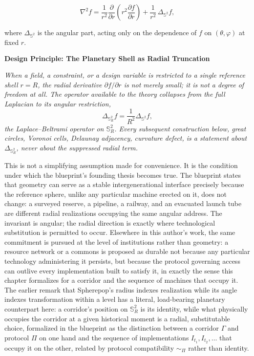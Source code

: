 \documentclass[11pt,fleqn]{book}
\numberwithin{equation}{chapter}
\newenvironment{principle}[1]
  {\begin{principleEnv}
   \noindent\textbf{Design Principle: #1}\par\smallskip\itshape}
  {\end{principleEnv}}
\theoremstyle{plain}
\theoremstyle{definition}
\theoremstyle{remark}
\newcommand{\Sphere}{\mathbb{S}^{2}}
\begin{document}
\begin{equation}
\nabla^2 f
=
\frac{1}{r^2}\frac{\partial}{\partial r}
\left(r^2\frac{\partial f}{\partial r}\right)
+
\frac{1}{r^2}\,\Delta_{\Sphere}f,
\end{equation}

where \(\Delta_{\Sphere}\) is the angular part, acting only on the dependence of \(f\) on \((\theta,\varphi)\) at fixed \(r\).

\begin{principle}{The Planetary Shell as Radial Truncation}
When a field, a constraint, or a design variable is restricted to a single reference shell \(r=R\), the radial derivative \(\partial f/\partial r\) is not merely small; it is not a degree of freedom at all. The operator available to the theory collapses from the full Laplacian to its angular restriction,
\[
\Delta_{\Sphere_R}f
=
\frac{1}{R^2}\Delta_{\Sphere}f,
\]
the Laplace--Beltrami operator on \(\Sphere_R\). Every subsequent construction below, great circles, Voronoi cells, Delaunay adjacency, curvature defect, is a statement about \(\Delta_{\Sphere_R}\), never about the suppressed radial term.
\end{principle}

This is not a simplifying assumption made for convenience. It is the condition under which the blueprint's founding thesis becomes true. The blueprint states that geometry can serve as a stable intergenerational interface precisely because the reference sphere, unlike any particular machine erected on it, does not change: a surveyed reserve, a pipeline, a railway, and an evacuated launch tube are different radial realizations occupying the same angular address. The invariant is angular; the radial direction is exactly where technological substitution is permitted to occur. Elsewhere in this author's work, the same commitment is pursued at the level of institutions rather than geometry: a resource network or a commons is proposed as durable not because any particular technology administering it persists, but because the protocol governing access can outlive every implementation built to satisfy it, in exactly the sense this chapter formalizes for a corridor and the sequence of machines that occupy it. The earlier remark that Spherepop's radius indexes realization while its angle indexes transformation within a level has a literal, load-bearing planetary counterpart here: a corridor's position on \(\Sphere_R\) is its identity, while what physically occupies the corridor at a given historical moment is a radial, substitutable choice, formalized in the blueprint as the distinction between a corridor \(\Gamma\) and protocol \(\Pi\) on one hand and the sequence of implementations \(I_{t_1}, I_{t_2}, \ldots\) that occupy it on the other, related by protocol compatibility \(\sim_\Pi\) rather than identity.
\end{document}
